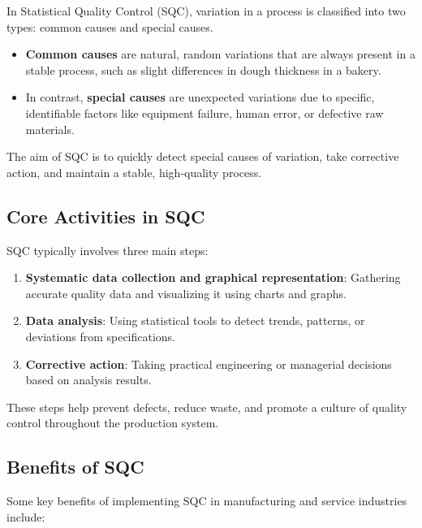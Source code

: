 \documentclass[twoside]{book}
\begin{document}
In Statistical Quality Control (SQC), variation in a process is classified into two types: common causes and special causes.

\begin{itemize}
\item \textbf{Common causes} are natural, random variations that are always present in a stable process, such as slight differences in dough thickness in a bakery.

\item In contrast,\textbf{ special causes} are unexpected variations due to specific, identifiable factors like equipment failure, human error, or defective raw materials.
\end{itemize}

The aim of SQC is to quickly detect special causes of variation, take corrective action, and maintain a stable, high-quality process.

\subsection{Core Activities in SQC}

SQC typically involves three main steps:
\begin{enumerate}
    \item \textbf{Systematic data collection and graphical representation}: Gathering accurate quality data and visualizing it using charts and graphs.
    \item \textbf{Data analysis}: Using statistical tools to detect trends, patterns, or deviations from specifications.
    \item \textbf{Corrective action}: Taking practical engineering or managerial decisions based on analysis results.
\end{enumerate}

These steps help prevent defects, reduce waste, and promote a culture of quality control throughout the production system.

\subsection{Benefits of SQC}

Some key benefits of implementing SQC in manufacturing and service industries include:
\end{document}
